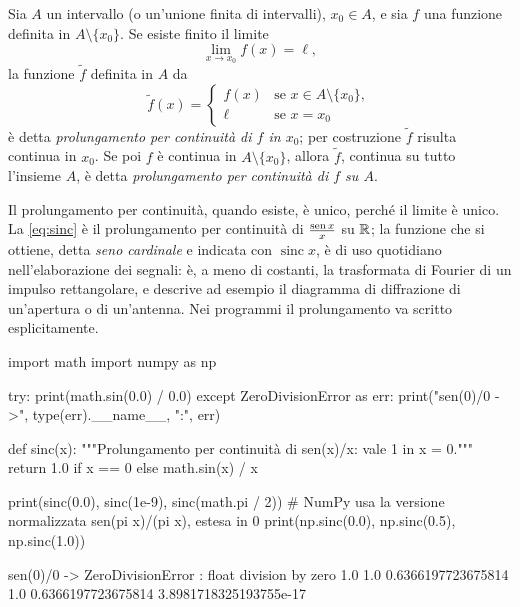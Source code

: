 \begin{definizione}\label{def:prolungamento}
Sia $A$ un intervallo (o un'unione finita di intervalli), $x_{0}\in A$, e sia $f$ una
funzione definita in $A\setminus\{x_{0}\}$. Se esiste finito il limite
\begin{equation}\label{eq:prolungamento-limite}
  \lim_{x\to x_{0}}f(x)=\ell,
\end{equation}
la funzione $\tilde f$ definita in $A$ da
\begin{equation}\label{eq:prolungamento}
  \tilde f(x)=
  \begin{cases}
    f(x) & \text{se } x\in A\setminus\{x_{0}\},\\
    \ell & \text{se } x=x_{0}
  \end{cases}
\end{equation}
è detta \emph{prolungamento per continuità di $f$ in $x_{0}$}; per costruzione $\tilde f$
risulta continua in $x_{0}$. Se poi $f$ è continua in $A\setminus\{x_{0}\}$, allora
$\tilde f$, continua su tutto l'insieme $A$, è detta \emph{prolungamento per continuità
di $f$ su $A$}.
\end{definizione}

Il prolungamento per continuità, quando esiste, è unico, perché il limite è unico.
La \eqref{eq:sinc} è il prolungamento per continuità di $\frac{\operatorname{sen} x}{x}$ su $\mathbb{R}$; la
funzione che si ottiene, detta \emph{seno cardinale} e indicata con $\operatorname{sinc}x$,
è di uso quotidiano nell'elaborazione dei segnali: è, a meno di costanti, la trasformata
di Fourier di un impulso rettangolare, e descrive ad esempio il diagramma di
diffrazione di un'apertura o di un'antenna. Nei programmi il prolungamento va scritto
esplicitamente.

\begin{python}
import math
import numpy as np

try:
    print(math.sin(0.0) / 0.0)
except ZeroDivisionError as err:
    print("sen(0)/0 ->", type(err).__name__, ":", err)

def sinc(x):
    """Prolungamento per continuità di sen(x)/x: vale 1 in x = 0."""
    return 1.0 if x == 0 else math.sin(x) / x

print(sinc(0.0), sinc(1e-9), sinc(math.pi / 2))
# NumPy usa la versione normalizzata sen(pi x)/(pi x), estesa in 0
print(np.sinc(0.0), np.sinc(0.5), np.sinc(1.0))
\end{python}
\begin{risultato}
sen(0)/0 -> ZeroDivisionError : float division by zero
1.0 1.0 0.6366197723675814
1.0 0.6366197723675814 3.8981718325193755e-17
\end{risultato}

